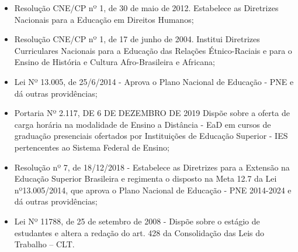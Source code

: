 \begin{itemize}
	\item Resolução CNE/CP nº 1, de 30 de maio de 2012. Estabelece as Diretrizes Nacionais para a Educação em Direitos Humanos;

	\item Resolução CNE/CP nº 1, de 17 de junho de 2004. Institui Diretrizes Curriculares Nacionais para a Educação das Relações Étnico-Raciais e para o Ensino de História e Cultura 	Afro-Brasileira e Africana;
	
	\item Lei Nº 13.005, de 25/6/2014 - Aprova o Plano Nacional de Educação - PNE e dá outras providências;
	
	\item Portaria Nº 2.117, DE 6 DE DEZEMBRO DE 2019 Dispõe sobre a oferta de carga horária na modalidade de Ensino a Distância - EaD em cursos de graduação presenciais ofertados por Instituições de Educação Superior - IES pertencentes ao Sistema Federal de Ensino;
	
	\item Resolução nº 7, de 18/12/2018 - Estabelece as Diretrizes para a Extensão na
	Educação Superior Brasileira e regimenta o disposto na Meta 12.7 da Lei nº13.005/2014, que aprova o Plano Nacional de Educação - PNE 2014-2024 e dá outras providências;
	
	\item Lei Nº 11788, de 25 de setembro de 2008 - Dispõe sobre o estágio de estudantes e altera a redação do art. 428 da Consolidação das Leis do Trabalho – CLT.
	
\end{itemize}
%
